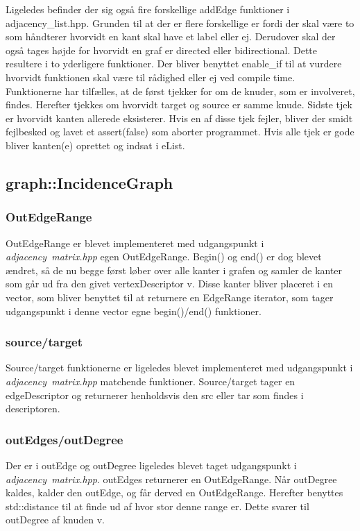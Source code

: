 \documentclass[a4paper,10pt,titlepage]{article}
\begin{document}
Ligeledes befinder der sig også fire forskellige addEdge funktioner i adjacency\_list.hpp. Grunden til at der er flere forskellige er fordi der skal være to som håndterer hvorvidt en kant skal have et label eller ej. Derudover skal der også tages højde for hvorvidt en graf er directed eller bidirectional. Dette resultere i to yderligere funktioner. Der bliver benyttet enable\_if til at vurdere hvorvidt funktionen skal være til rådighed eller ej ved compile time. \\
Funktionerne har tilfælles, at de først tjekker for om de knuder, som er involveret, findes. Herefter tjekkes om hvorvidt target og source er samme knude. Sidste tjek er hvorvidt kanten allerede eksisterer. Hvis en af disse tjek fejler, bliver der smidt fejlbesked og lavet et assert(false) som aborter programmet. Hvis alle tjek er gode bliver kanten(e) oprettet og indsat i eList.

\subsection{graph::IncidenceGraph}
\subsubsection{OutEdgeRange}
OutEdgeRange er blevet implementeret med udgangspunkt i \textit{adjacency\ matrix.hpp} egen OutEdgeRange. Begin() og end() er dog blevet ændret, så de nu begge først løber over alle kanter i grafen og samler de kanter som går ud fra den givet vertexDescriptor v. Disse kanter bliver placeret i en vector, som bliver benyttet til at returnere en EdgeRange iterator, som tager udgangspunkt i denne vector egne begin()/end() funktioner.
\subsubsection{source/target}
Source/target funktionerne er ligeledes blevet implementeret med udgangspunkt i \textit{adjacency\ matrix.hpp} matchende funktioner. Source/target tager en edgeDescriptor og returnerer henholdsvis den src eller tar som findes i descriptoren.
\subsubsection{outEdges/outDegree}
Der er i outEdge og outDegree ligeledes blevet taget udgangspunkt i \textit{adjacency\ matrix.hpp}. outEdges returnerer en OutEdgeRange. Når outDegree kaldes, kalder den outEdge, og får derved en OutEdgeRange. Herefter benyttes std::distance til at finde ud af hvor stor denne range er. Dette svarer til outDegree af knuden v.
\end{document}
